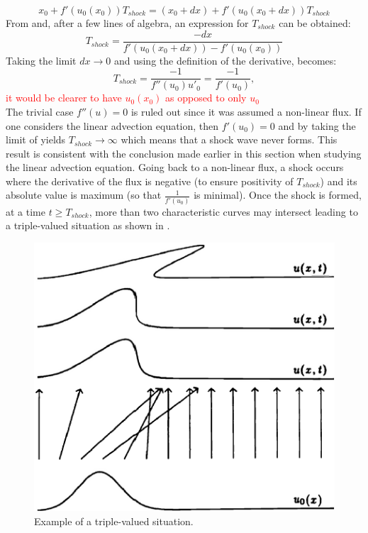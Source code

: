 %
\begin{equation}\label{eq:cc1b_sct1b}
x_0 + f'(u_0(x_0)) T_{shock} = (x_0 + dx) + f'(u_0(x_0+dx)) T_{shock}
\end{equation}
%
From  and, after a few lines of algebra, an expression for $T_{shock}$ can be obtained: 
\begin{equation}\label{eq:cc2a_sct1b}
T_{shock} = \frac{-dx}{f'(u_0(x_0+dx))-f'(u_0(x_0))}
\end{equation} 
Taking the limit $dx \to 0$ and using the definition of the derivative,  becomes:
\begin{equation}\label{eq:cc2_sct1b}
T_{shock} = \frac{-1}{f''(u_0) u'_0} = \frac{-1}{f'(u_0)},
\end{equation} 
\textcolor{red}{it would be clearer to have $u_0(x_0)$ as opposed to only $u_0$}\\
The trivial case $f''(u) = 0$ is ruled out since it was assumed a non-linear flux. 
If one considers the linear advection equation, then $f'(u_0)=0$ and by taking the limit of  yields $T_{shock} \to \infty$ which means that a shock wave never forms. This result is consistent with the conclusion made earlier in this section when studying the linear advection equation. Going back to a non-linear flux, a shock occurs where the derivative of the flux is negative (to ensure positivity of $T_{shock}$) and its absolute value is maximum (so that $\frac{1}{f'(u_0)}$ is minimal). Once the shock is formed, at a time $t \geq T_{shock}$, more than two characteristic curves may intersect leading to a triple-valued situation as shown in . 
%
\begin{figure}[H]
\centering
\includegraphics[width=\textwidth]{figures/charact_curves_burger.png}
\caption{Example of a triple-valued situation.}
\label{fig:triple_pt_bg_sct1b}
\end{figure}
